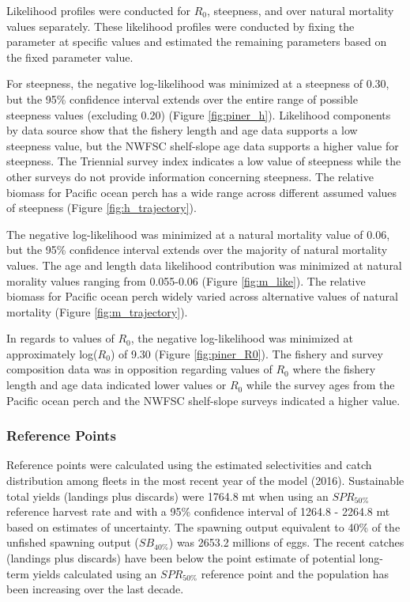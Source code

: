 \documentclass[12pt,]{article}
\begin{document}
Likelihood profiles were conducted for \(R_0\), steepness, and over
natural mortality values separately. These likelihood profiles were
conducted by fixing the parameter at specific values and estimated the
remaining parameters based on the fixed parameter value.

For steepness, the negative log-likelihood was minimized at a steepness
of 0.30, but the 95\% confidence interval extends over the entire range
of possible steepness values (excluding 0.20) (Figure
\ref{fig:piner_h}). Likelihood components by data source show that the
fishery length and age data supports a low steepness value, but the
NWFSC shelf-slope age data supports a higher value for steepness. The
Triennial survey index indicates a low value of steepness while the
other surveys do not provide information concerning steepness. The
relative biomass for Pacific ocean perch has a wide range across
different assumed values of steepness (Figure \ref{fig:h_trajectory}).

The negative log-likelihood was minimized at a natural mortality value
of 0.06, but the 95\% confidence interval extends over the majority of
natural mortality values. The age and length data likelihood
contribution was minimized at natural morality values ranging from
0.055-0.06 (Figure \ref{fig:m_like}). The relative biomass for Pacific
ocean perch widely varied across alternative values of natural mortality
(Figure \ref{fig:m_trajectory}).

In regards to values of \(R_0\), the negative log-likelihood was
minimized at approximately log(\(R_0\)) of 9.30 (Figure
\ref{fig:piner_R0}). The fishery and survey composition data was in
opposition regarding values of \(R_0\) where the fishery length and age
data indicated lower values or \(R_0\) while the survey ages from the
Pacific ocean perch and the NWFSC shelf-slope surveys indicated a higher
value.

\subsubsection{Reference Points}\label{reference-points-1}

Reference points were calculated using the estimated selectivities and
catch distribution among fleets in the most recent year of the model
(2016). Sustainable total yields (landings plus discards) were 1764.8 mt
when using an \(SPR_{50\%}\) reference harvest rate and with a 95\%
confidence interval of 1264.8 - 2264.8 mt based on estimates of
uncertainty. The spawning output equivalent to 40\% of the unfished
spawning output (\(SB_{40\%}\)) was 2653.2 millions of eggs. The recent
catches (landings plus discards) have been below the point estimate of
potential long-term yields calculated using an \(SPR_{50\%}\) reference
point and the population has been increasing over the last decade.
\end{document}
